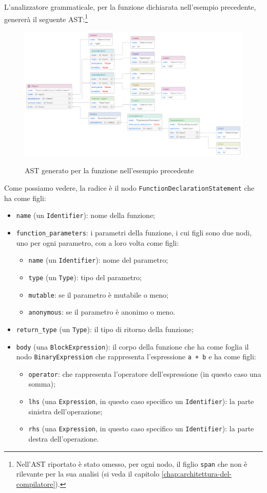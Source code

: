 L'analizzatore grammaticale, per la funzione dichiarata nell'esempio precedente, generer\`a il seguente AST:\footnote{Nell'AST riportato \`e stato omesso, per ogni nodo, il figlio \texttt{span} che non \`e rilevante per la sua analisi (si veda il capitolo \ref{chap:architettura-del-compilatore}).}
\begin{figure}[H]
	\includegraphics[width=\textwidth]{figures/function_declaration_ast.png}
	\label{fig:bugginout-example-function-declaration-ast}
	\caption{AST generato per la funzione nell'esempio precedente}
\end{figure}
Come possiamo vedere, la radice \`e il nodo \texttt{FunctionDeclarationStatement} che ha come figli:
\begin{itemize}
	\item \texttt{name} (un \texttt{Identifier}): nome della funzione;
	\item \texttt{function\_parameters}: i parametri della funzione, i cui figli sono due nodi, uno per ogni parametro, con a loro volta come figli:
	\begin{itemize}
		\item \texttt{name} (un \texttt{Identifier}): nome del parametro;
		\item \texttt{type} (un \texttt{Type}): tipo del parametro;
		\item \texttt{mutable}: se il parametro \`e mutabile o meno;
		\item \texttt{anonymous}: se il parametro \`e anonimo o meno.
	\end{itemize}
	\item \texttt{return\_type} (un \texttt{Type}): il tipo di ritorno della funzione;
	\item \texttt{body} (una \texttt{BlockExpression}): il corpo della funzione che ha come foglia il nodo \texttt{BinaryExpression} che rappresenta l'espressione \texttt{a + b} e ha come figli:
	\begin{itemize}
		\item \texttt{operator}: che rappresenta l'operatore dell'espressione (in questo caso una somma);
		\item \texttt{lhs} (una \texttt{Expression}, in questo caso specifico un \texttt{Identifier}): la parte sinistra dell'operazione;
		\item \texttt{rhs} (una \texttt{Expression}, in questo caso specifico un \texttt{Identifier}): la parte destra dell'operazione.
	\end{itemize}
\end{itemize}

